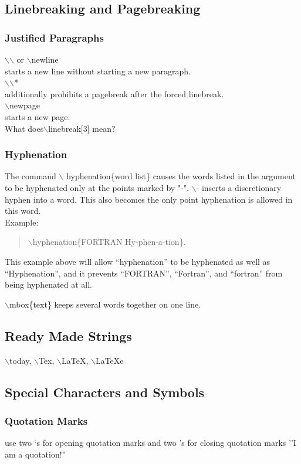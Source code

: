 \documentclass[11pt,a4paper]{article}
\begin{document}
\subsection{Linebreaking and Pagebreaking}
\subsubsection{Justified Paragraphs}
$\backslash$$\backslash$ or $\backslash$newline\\ starts a new line 
without starting a new paragraph.\\
$\backslash$$\backslash$* \\additionally prohibits a pagebreak after the forced
linebreak.\\
$\backslash$newpage \\starts a new page.\\

What does$\backslash$linebreak[3] mean?\linebreak[3]
\subsubsection{Hyphenation}
The command $\backslash$ hyphenation\{word list\} causes the words listed in the
argument to be hyphenated only at the points marked by "-".
$\backslash$- inserts a discretionary hyphen into a word. This also becomes the only
point hyphenation is allowed in this word.\\

Example:
\begin{quote}
    $\backslash$hyphenation\{FORTRAN Hy-phen-a-tion\}.
\end{quote}
This example above will allow ``hyphenation'' to be hyphenated as well as 
``Hyphenation'', and it prevents ``FORTRAN'', ``Fortran'', and ``fortran'' from
being hyphenated at all.

$\backslash$mbox\{text\} keeps several words together on one line.
\subsection{Ready Made Strings}
$\backslash$today, $\backslash$Tex, $\backslash$LaTeX, $\backslash$LaTeXe
\subsection{Special Characters and Symbols}
\subsubsection{Quotation Marks}
use two `s for opening quotation marks and two 's for closing quotation marks
''I am a quotation!''
\end{document}
